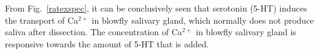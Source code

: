 From Fig.~\ref{ratexspec}, it can be conclusively seen that serotonin (5-HT) induces the transport of Ca$^{2+}$ in blowfly salivary gland, which normally does not produce saliva after dissection. 
The concentration of Ca$^{2+}$ in blowfly salivary gland is responsive towards the amount of 5-HT that is added. 
 

\renewcommand{\refname}{\spacedlowsmallcaps{References}} %

%



